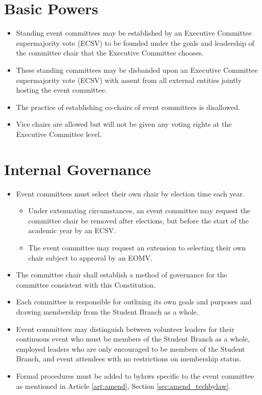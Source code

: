 \documentclass[12pt]{constitution}
\begin{document}
\label{art:event}

\section{Basic Powers}
\label{sec:event_pow}
\begin{itemize}
    \item Standing event committees may be established by an Executive Committee supermajority vote (ECSV) to be founded under the goals and leadership of the committee chair that the Executive Committee chooses.
    \item These standing committees may be disbanded upon an Executive Committee supermajority vote (ECSV) with assent from all external entities jointly hosting the event committee.
    \item The practice of establishing co-chairs of event committees is disallowed.
    \item Vice chairs are allowed but will not be given any voting rights at the Executive Committee level.
\end{itemize}

\section{Internal Governance}
\label{sec:event_govern}
\begin{itemize}
    \item Event committees must select their own chair by election time each year.
	\begin{itemize}
	\item Under extenuating circumstances, an event committee may request the committee chair be removed after elections, but before the start of the academic year by an ECSV. 
	\item The event committee may request an extension to selecting their own chair subject to approval by an EOMV.
	\end{itemize}
    \item The committee chair shall establish a method of governance for the committee consistent with this Constitution.
    \item Each committee is responsible for outlining its own goals and purposes and drawing membership from the Student Branch as a whole.
    \item Event committees may distinguish between volunteer leaders for their continuous event who must be members of the Student Branch as a whole, employed leaders who are only encouraged to be members of the Student Branch, and event attendees with no restrictions on membership status.
    \item Formal procedures must be added to bylaws specific to the event committee as mentioned in Article \ref{art:amend}, Section \ref{sec:amend_techbylaw}.
\end{itemize}
\end{document}
